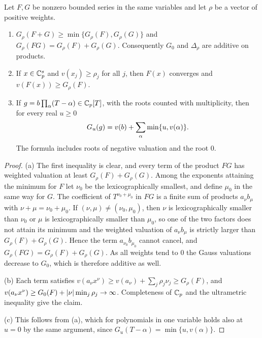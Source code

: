 \begin{lemma}\label{tors:lem:gauss}
Let $F,G$ be nonzero bounded series in the same variables and let $\rho$ be a vector of
positive weights.
\begin{enumerate}[label=\textup{(\alph*)}]
\item $G_\rho(F+G)\ge\min\{G_\rho(F),G_\rho(G)\}$ and $G_\rho(FG)=G_\rho(F)+G_\rho(G)$.
  Consequently $G_0$ and $\Delta_\rho$ are additive on products.
\item If $x\in\mathbb{C}_p^s$ and $v(x_j)\ge\rho_j$ for all $j$, then $F(x)$ converges and
  $v(F(x))\ge G_\rho(F)$.
\item If $g=b\prod_\alpha(T-\alpha)\in\mathbb{C}_p[T]$, with the roots counted with multiplicity,
  then for every real $u\ge0$
  \begin{equation}\label{tors:eq:gauss}\torsalsolabel{cost:eq:gauss}
    G_u(g)=v(b)+\sum_\alpha\min\{u,v(\alpha)\}.
  \end{equation}
  The formula includes roots of negative valuation and the root $0$.
\end{enumerate}
\end{lemma}

\begin{proof}
(a) The first inequality is clear, and every term of the product $FG$ has weighted
valuation at least $G_\rho(F)+G_\rho(G)$. Among the exponents attaining the minimum for
$F$ let $\nu_0$ be the lexicographically smallest, and define $\mu_0$ in the same way for
$G$. The coefficient of $T^{\nu_0+\mu_0}$ in $FG$ is a finite sum of products
$a_\nu b_\mu$ with $\nu+\mu=\nu_0+\mu_0$. If $(\nu,\mu)\ne(\nu_0,\mu_0)$, then $\nu$ is
lexicographically smaller than $\nu_0$ or $\mu$ is lexicographically smaller than $\mu_0$,
so one of the two factors does not attain its minimum and the weighted valuation of
$a_\nu b_\mu$ is strictly larger than $G_\rho(F)+G_\rho(G)$. Hence the term
$a_{\nu_0}b_{\mu_0}$ cannot cancel, and $G_\rho(FG)=G_\rho(F)+G_\rho(G)$. As all weights
tend to $0$ the Gauss valuations decrease to $G_0$, which is therefore additive as well.

(b) Each term satisfies $v(a_\nu x^\nu)\ge v(a_\nu)+\sum_j\rho_j\nu_j\ge G_\rho(F)$, and
$v(a_\nu x^\nu)\ge G_0(F)+\lvert\nu\rvert\min_j\rho_j\to\infty$. Completeness of $\mathbb{C}_p$ and the
ultrametric inequality give the claim.

(c) This follows from (a), which for polynomials in one variable holds also at $u=0$ by
the same argument, since $G_u(T-\alpha)=\min\{u,v(\alpha)\}$.
\end{proof}

